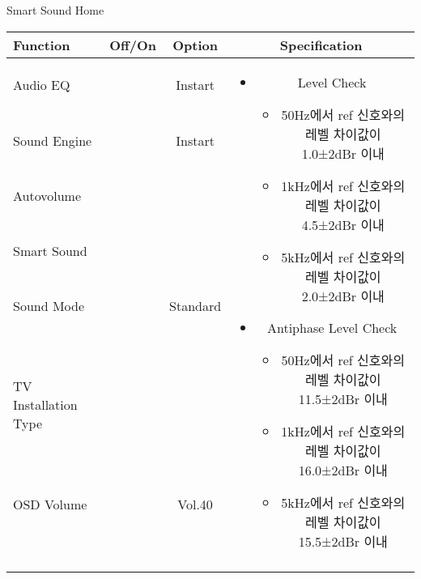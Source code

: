 \begin{frame}[t]{Smart Sound Home}
\begin{tiny}
\begin{tabular}{@{}lccc@{}}
\toprule
Function & Off/On & Option & Specification \\
\midrule
Audio EQ & \color{black}{Off} & Instart &
\multirow{10}{60mm}{
\begin{itemize}
\item Level Check
	\begin{itemize}
	\item 50Hz에서 ref 신호와의 레벨 차이값이 1.0±2dBr 이내
	\item 1kHz에서 ref 신호와의 레벨 차이값이 4.5±2dBr 이내
	\item 5kHz에서 ref 신호와의 레벨 차이값이 2.0±2dBr 이내
	\end{itemize}
\item Antiphase Level Check
	\begin{itemize}
	\item 50Hz에서 ref 신호와의 레벨 차이값이 11.5±2dBr 이내
	\item 1kHz에서 ref 신호와의 레벨 차이값이 16.0±2dBr 이내
	\item 5kHz에서 ref 신호와의 레벨 차이값이 15.5±2dBr 이내
	\end{itemize}
\end{itemize}
} \\
Sound Engine & \color{blue}{On} & Instart & \\
Autovolume & \color{black}{Off} & & \\
Smart Sound & \color{blue}{On} & & \\
Sound Mode & \color{blue}{On} & Standard & \\
TV Installation Type & \color{blue}{On} & \color{black}{Standtype1} & \\
OSD Volume & \color{blue}{On} & Vol.40 & \\
& & & \\
& & & \\
& & & \\
& & & \\
\midrule
\end{tabular}
\end{tiny}

\end{frame}
